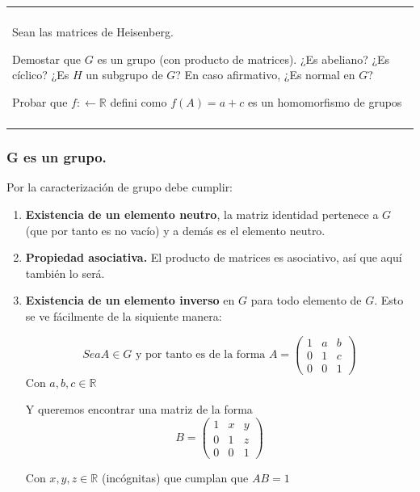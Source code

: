 \documentclass[12pt]{article}
\newenvironment{micaja}
{
    \begin{center}
    \begin{tabular}{|p{0.9\textwidth}|}
    \hline\\
    }   
    {   
    \\\\\hline
    \end{tabular} 
    \end{center}
    }
\begin{document}
\begin{micaja}
    Sean las matrices de Heisenberg. 

    Demostar que $G$ es un grupo (con producto de matrices). ¿Es abeliano? ¿Es cíclico?
    ¿Es $H$ un subgrupo de $G$? En caso afirmativo, ¿Es normal en $G$?

    Probar que $f: \leftarrow \mathbb R$ defini como $f(A)=a+c$ es un homomorfismo de grupos 
\end{micaja}

\subsubsection*{G es un grupo.}

Por la caracterización de grupo debe cumplir: 

\begin{enumerate}
    \item \textbf{Existencia de un elemento neutro}, la matriz identidad pertenece a $G$ 
    (que por tanto es no vacío) y a demás es el elemento neutro. 
    \item \textbf{Propiedad asociativa.} El producto de matrices es asociativo, así que aquí 
    también lo será. 
    \item \textbf{Existencia de un elemento inverso} en $G$ para todo elemento de $G$. 
    Esto se ve fácilmente de la siquiente manera: 

    \begin{equation*}
        Sea A \in G \text{ y por tanto es de la forma } A = 
        \left(
        \begin{matrix}
            1 & a & b \\
            0 & 1 & c \\
            0 & 0 & 1
        \end{matrix}
        \right)
    \end{equation*}
    Con $a,b,c\in \mathbb{R}$

    Y queremos encontrar una matriz de la forma 
    \begin{equation*}
        B= \left(
        \begin{matrix}
            1 & x & y \\
            0 & 1 & z \\
            0 & 0 & 1
        \end{matrix}
        \right)
    \end{equation*}

    Con $x,y,z \in \mathbb{R}$ (incógnitas) que cumplan que $AB = 1$


\end{enumerate}
\end{document}
